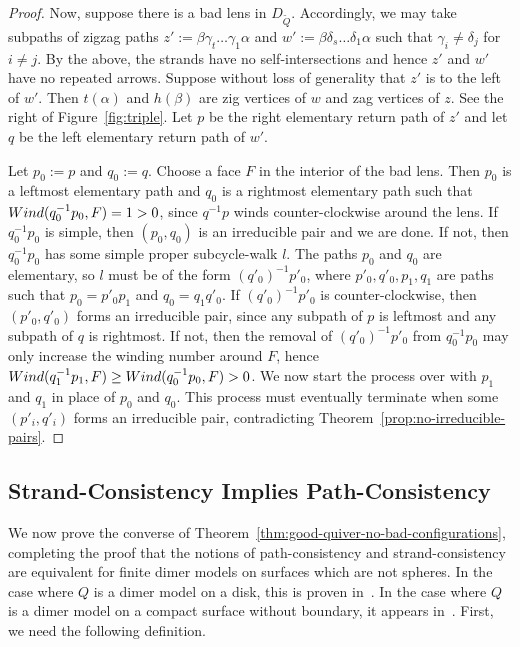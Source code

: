 \documentclass{article}
\theoremstyle{definition}
\newcommand{\wind}{\textup{Wind}}
\begin{document}
\begin{proof}
    
		Now, suppose there is a bad lens in $D_{\widetilde Q}$. Accordingly, we may take subpaths of zigzag paths $z':=\beta\gamma_t\dots\gamma_1\alpha$ and $w':=\beta\delta_s\dots\delta_1\alpha$ such that $\gamma_i\neq\delta_j$ for $i\neq j$. By the above, the strands have no self-intersections and hence $z'$ and $w'$ have no repeated arrows. Suppose without loss of generality that $z'$ is to the left of $w'$. Then $t(\alpha)$ and $h(\beta)$ are zig vertices of $w$ and zag vertices of $z$. See the right of Figure~\ref{fig:triple}. Let $p$ be the right elementary return path of $z'$ and let $q$ be the left elementary return path of $w'$. 

		Let $p_0:=p$ and $q_0:=q$. Choose a face $F$ in the interior of the bad lens. Then $p_0$ is a leftmost elementary path and $q_0$ is a rightmost elementary path such that $\wind(q_0^{-1}p_0,F)=1>0$, since $q^{-1}p$ winds counter-clockwise around the lens. If $q_0^{-1}p_0$ is simple, then $(p_0,q_0)$ is an irreducible pair and we are done. If not, then $q_0^{-1}p_0$ has some simple proper subcycle-walk $l$. The paths $p_0$ and $q_0$ are elementary, so $l$ must be of the form $(q'_0)^{-1}p'_0$, where $p'_0,q'_0,p_1,q_1$ are paths such that $p_0=p'_0p_1$ and $q_0=q_1q'_0$. If $(q'_0)^{-1}p'_0$ is counter-clockwise, then $(p'_0,q'_0)$ forms an irreducible pair, since any subpath of $p$ is leftmost and any subpath of $q$ is rightmost. If not, then the removal of $(q'_0)^{-1}p'_0$ from $q_0^{-1}p_0$ may only increase the winding number around $F$, hence $\wind(q_1^{-1}p_1,F)\geq\wind(q_0^{-1}p_0,F)>0$. We now start the process over with $p_1$ and $q_1$ in place of $p_0$ and $q_0$. This process must eventually terminate when some $(p'_i,q'_i)$ forms an irreducible pair, contradicting Theorem~\ref{prop:no-irreducible-pairs}.
\end{proof}







\subsection{Strand-Consistency Implies Path-Consistency}

We now prove the converse of Theorem~\ref{thm:good-quiver-no-bad-configurations}, completing the proof that the notions of path-consistency and strand-consistency are equivalent for finite dimer models on surfaces which are not spheres.
In the case where $Q$ is a dimer model on a disk, this is proven in~\cite[Proposition 2.15]{CKP}. In the case where $Q$ is a dimer model on a compact surface without boundary, it appears in~\cite[Theorem 10.1, Theorem 10.2]{XBocklandt2011}.
First, we need the following definition.
\end{document}
